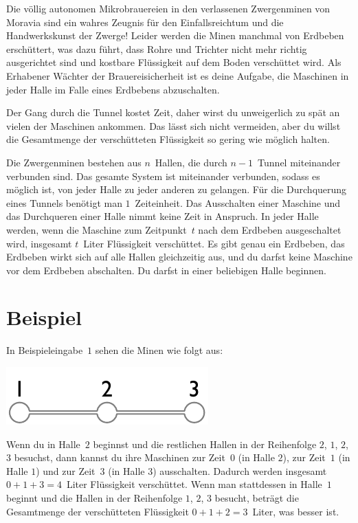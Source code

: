
\noindent
Die völlig autonomen Mikrobrauereien in den verlassenen Zwergenminen von Moravia sind ein wahres Zeugnis für den Einfallsreichtum und die Handwerkskunst der Zwerge!
Leider werden die Minen manchmal von Erdbeben erschüttert, was dazu führt, dass Rohre und Trichter nicht mehr richtig ausgerichtet sind und kostbare Flüssigkeit auf dem Boden verschüttet wird.
Als Erhabener Wächter der Brauereisicherheit ist es deine Aufgabe, die Maschinen in jeder Halle im Falle eines Erdbebens abzuschalten.

Der Gang durch die Tunnel kostet Zeit, 
daher wirst du unweigerlich zu spät an vielen der Maschinen ankommen.
Das lässt sich nicht vermeiden, aber du willst die Gesamtmenge der verschütteten Flüssigkeit so gering wie möglich halten.

\medskip
Die Zwergenminen bestehen aus $n$~Hallen, die durch $n-1$~Tunnel miteinander verbunden sind.
Das gesamte System ist miteinander verbunden, sodass es möglich ist, von jeder Halle zu jeder anderen zu gelangen.
Für die Durchquerung eines Tunnels benötigt man $1$~Zeiteinheit.
Das Ausschalten einer Maschine und das Durchqueren einer Halle nimmt keine Zeit in Anspruch.
In jeder Halle werden, wenn die Maschine zum Zeitpunkt~$t$ nach dem Erdbeben ausgeschaltet wird, insgesamt $t$~Liter Flüssigkeit verschüttet.
Es gibt genau ein Erdbeben, das Erdbeben wirkt sich auf alle Hallen gleichzeitig aus, und du darfst keine Maschine vor dem Erdbeben abschalten.
Du darfst in einer beliebigen Halle beginnen.

\section*{Beispiel}

In Beispieleingabe~$1$ sehen die Minen wie folgt aus:

\includegraphics[width=.2\textwidth]{img/sample-1.pdf}

Wenn du in Halle~$2$ beginnst und die restlichen Hallen in der Reihenfolge $2$, $1$, $2$, $3$ besuchst, dann kannst du ihre Maschinen zur Zeit~$0$ (in Halle $2$), zur Zeit~$1$ (in Halle $1$) und zur Zeit~$3$ (in Halle $3$) ausschalten.
Dadurch werden insgesamt $0+1+3=4$~Liter Flüssigkeit verschüttet.
Wenn man stattdessen in Halle~$1$ beginnt und die Hallen in der Reihenfolge $1$, $2$, $3$ besucht, beträgt die Gesamtmenge der verschütteten Flüssigkeit $0+1+2=3$~Liter, was besser ist.

